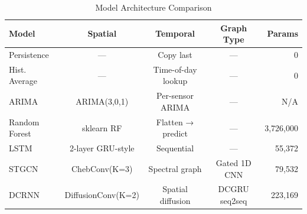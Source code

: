 \begin{table}[ht]
\centering
\caption{Model Architecture Comparison}
\label{tab:architecture}
\begin{tabular}{lcccr}
\toprule
Model & Spatial & Temporal & Graph Type & Params \\
\midrule
Persistence & — & Copy last & — & 0 \\
Hist. Average & — & Time-of-day lookup & — & 0 \\
ARIMA & ARIMA(3,0,1) & Per-sensor ARIMA & — & N/A \\
Random Forest & sklearn RF & Flatten → predict & — & 3,726,000 \\
LSTM & 2-layer GRU-style & Sequential & — & 55,372 \\
STGCN & ChebConv(K=3) & Spectral graph & Gated 1D CNN & 79,532 \\
DCRNN & DiffusionConv(K=2) & Spatial diffusion & DCGRU seq2seq & 223,169 \\
\bottomrule
\end{tabular}
\end{table}
